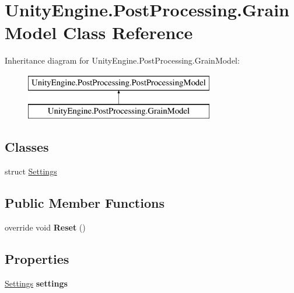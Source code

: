 \hypertarget{class_unity_engine_1_1_post_processing_1_1_grain_model}{}\section{Unity\+Engine.\+Post\+Processing.\+Grain\+Model Class Reference}
\label{class_unity_engine_1_1_post_processing_1_1_grain_model}
Inheritance diagram for Unity\+Engine.\+Post\+Processing.\+Grain\+Model\+:\begin{figure}[H]
\begin{center}
\leavevmode
\includegraphics[height=2.000000cm]{class_unity_engine_1_1_post_processing_1_1_grain_model}
\end{center}
\end{figure}
\subsection*{Classes}
\begin{DoxyCompactItemize}
\item 
struct \hyperlink{struct_unity_engine_1_1_post_processing_1_1_grain_model_1_1_settings}{Settings}
\end{DoxyCompactItemize}
\subsection*{Public Member Functions}
\begin{DoxyCompactItemize}
\item 
\mbox{\label{class_unity_engine_1_1_post_processing_1_1_grain_model_ab4dbacfe4c524d5e483285e361897d30}} 
override void {\bfseries Reset} ()
\end{DoxyCompactItemize}
\subsection*{Properties}
\begin{DoxyCompactItemize}
\item 
\mbox{\label{class_unity_engine_1_1_post_processing_1_1_grain_model_afbb518425ab6874c1578abf45f5bd1fb}} 
\hyperlink{struct_unity_engine_1_1_post_processing_1_1_grain_model_1_1_settings}{Settings} {\bfseries settings}
\end{DoxyCompactItemize}
